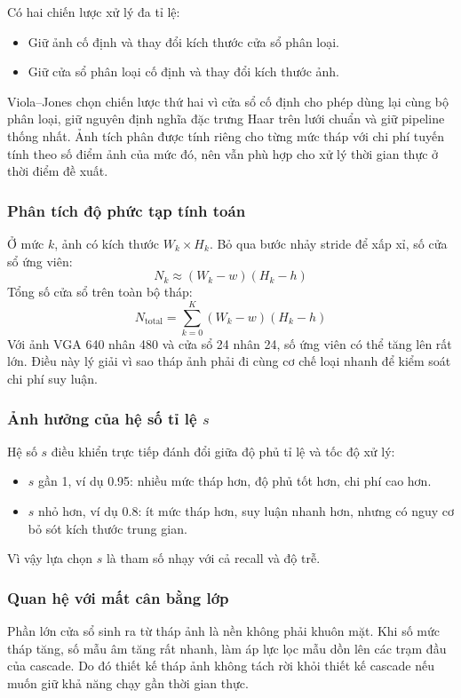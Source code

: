 Có hai chiến lược xử lý đa tỉ lệ:
\begin{itemize}
  \item Giữ ảnh cố định và thay đổi kích thước cửa sổ phân loại.
  \item Giữ cửa sổ phân loại cố định và thay đổi kích thước ảnh.
\end{itemize}
Viola--Jones chọn chiến lược thứ hai vì cửa sổ cố định cho phép dùng lại cùng bộ phân loại, giữ nguyên định nghĩa đặc trưng Haar trên lưới chuẩn và giữ pipeline thống nhất.
Ảnh tích phân được tính riêng cho từng mức tháp với chi phí tuyến tính theo số điểm ảnh của mức đó, nên vẫn phù hợp cho xử lý thời gian thực ở thời điểm đề xuất.  \cite{viola2001rapid,viola2004robust}

\subsubsection{Phân tích độ phức tạp tính toán}

Ở mức $k$, ảnh có kích thước $W_k \times H_k$.
Bỏ qua bước nhảy stride để xấp xỉ, số cửa sổ ứng viên:
\[
N_k \approx (W_k - w)(H_k - h)
\]
Tổng số cửa sổ trên toàn bộ tháp:
\[
N_{\text{total}}=\sum_{k=0}^{K} (W_k - w)(H_k - h)
\]
Với ảnh VGA 640 nhân 480 và cửa sổ 24 nhân 24, số ứng viên có thể tăng lên rất lớn.
Điều này lý giải vì sao tháp ảnh phải đi cùng cơ chế loại nhanh để kiểm soát chi phí suy luận.  \cite{li2012facechapter}

\subsubsection{Ảnh hưởng của hệ số tỉ lệ $s$}

Hệ số $s$ điều khiển trực tiếp đánh đổi giữa độ phủ tỉ lệ và tốc độ xử lý:
\begin{itemize}
  \item $s$ gần 1, ví dụ 0.95: nhiều mức tháp hơn, độ phủ tốt hơn, chi phí cao hơn.
  \item $s$ nhỏ hơn, ví dụ 0.8: ít mức tháp hơn, suy luận nhanh hơn, nhưng có nguy cơ bỏ sót kích thước trung gian.
\end{itemize}
Vì vậy lựa chọn $s$ là tham số nhạy với cả recall và độ trễ.

\subsubsection{Quan hệ với mất cân bằng lớp}

Phần lớn cửa sổ sinh ra từ tháp ảnh là nền không phải khuôn mặt.
Khi số mức tháp tăng, số mẫu âm tăng rất nhanh, làm áp lực lọc mẫu dồn lên các trạm đầu của cascade.
Do đó thiết kế tháp ảnh không tách rời khỏi thiết kế cascade nếu muốn giữ khả năng chạy gần thời gian thực.

